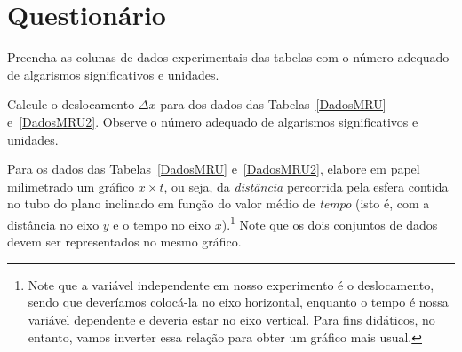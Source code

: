 \vspace{15mm}

\begin{fullwidth}
\noindent{}
\vspace{5mm}

\noindent{}

\noindent{}

\noindent{}

\noindent{}

\noindent{}
\end{fullwidth}

\vspace{5mm}

\section{Questionário}

\begin{question}[type={exam}]{2}
Preencha as colunas de dados experimentais das tabelas com o número adequado de algarismos significativos e unidades.
\end{question}

\begin{question}[type={exam}]{2}
Calcule o deslocamento $\Delta x$ para dos dados das Tabelas~\ref{DadosMRU} e~\ref{DadosMRU2}. Observe o número adequado de algarismos significativos e unidades.
\end{question}

\begin{question}[type={exam}]{3}
Para os dados das Tabelas~\ref{DadosMRU} e~\ref{DadosMRU2}, elabore em papel milimetrado um gráfico $x \times t$, ou seja, da \emph{distância} percorrida pela esfera contida no tubo do plano inclinado em função do valor médio de \emph{tempo} (isto é, com a distância no eixo $y$ e o tempo no eixo $x$).\footnote{Note que a variável independente em nosso experimento é o deslocamento, sendo que deveríamos colocá-la no eixo horizontal, enquanto o tempo é nossa variável dependente e deveria estar no eixo vertical. Para fins didáticos, no entanto, vamos inverter essa relação para obter um gráfico mais usual.} Note que os dois conjuntos de dados devem ser representados no mesmo gráfico.
\end{question}


